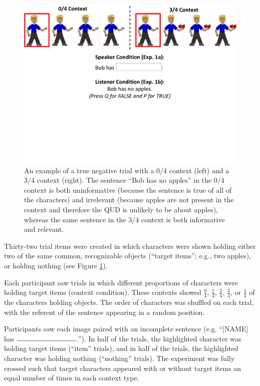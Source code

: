 \documentclass[man, floatsintext, noapacite]{apa6}
\begin{document}
\begin{figure}[t]
\begin{center} 
\includegraphics[width=6in]{figures/experiment1/trialfig_exp1.pdf}
\caption{\label{fig:exp1_trial} An example of a true negative trial with a 0/4 context (left) and a 3/4 context (right).  The sentence ``Bob has no apples'' in the 0/4 context is both uninformative (because the sentence is true of all of the characters) and irrelevant (because apples are not present in the context and therefore the QUD is unlikely to be about apples), whereas the same sentence in the 3/4 context is both informative and relevant. }
\vspace{-5mm}
\end{center} 
\end{figure}

Thirty-two trial items were created in which characters were shown holding either two of the same common, recognizable objects (``target items''; e.g., two apples), or holding nothing (see Figure \ref{fig:exp1_trial}). 

Each participant saw trials in which different proportions of characters were holding target items (context condition).  These contexts showed $\frac{0}{4}$, $\frac{1}{4}$, $\frac{2}{4}$, $\frac{3}{4}$, or $\frac{4}{4}$ of the characters holding objects. The order of characters was shuffled on each trial, with the referent of the sentence appearing in a random position. 

Participants saw each image paired with an incomplete sentence (e.g. ``[NAME] has $\rule{3cm}{0.15mm}$.''). In half of the trials, the highlighted character was holding target items (``item'' trials), and in half of the trials, the highlighted character was holding nothing (``nothing'' trials).  The experiment was fully crossed such that target characters appeared with or without target items an equal number of times in each context type. 
\end{document}
